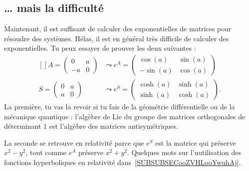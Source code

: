 \subsection{\ldots{} mais la difficulté}

Maintenant, il est suffisant de calculer des exponentielles de matrices pour résoudre des systèmes. Hélas, il est en général très difficile de calculer des exponentielles. Tu peux essayer de prouver les deux suivantes :
\begin{equation}
	\begin{aligned}[]
		A=\begin{pmatrix}
			  0  & a \\
			  -a & 0
		  \end{pmatrix} & \leadsto  e^{A}=\begin{pmatrix}
			                                  \cos(a)  & \sin(a) \\
			                                  -\sin(a) & \cos(a)
		                                  \end{pmatrix}  \\
		S=\begin{pmatrix}
			  0 & a \\
			  a & 0
		  \end{pmatrix} & \leadsto  e^{S}=\begin{pmatrix}
			                                  \cosh(a) & \sinh(a) \\
			                                  \sinh(a) & \cosh(a)
		                                  \end{pmatrix}.
	\end{aligned}
\end{equation}
La première, tu vas la revoir si tu fais de la géométrie différentielle ou de la mécanique quantique : l'algèbre de Lie du groupe des matrices orthogonales de déterminant \( 1\) est l'algèbre des matrices antisymétriques.

La seconde se retrouve en relativité parce que \( e^S\) est la matrice qui préserve \( x^2-y^2\), tout comme \( e^A\) préserve \( x^2+y^2\). Quelques mots sur l'uutilisation des fonctions hyperboliques en relativité dans~\ref{SUBSUBSECooZVHLooYwuhAj}.

